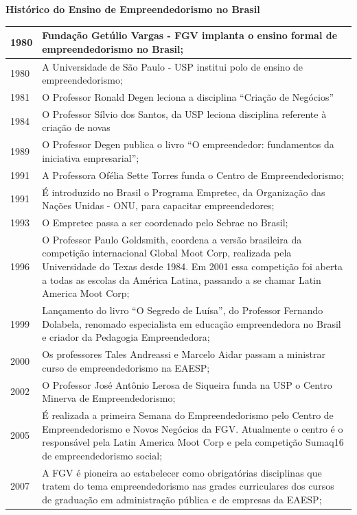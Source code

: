\begin{quadro}[!htb]
\caption{\label{tabela_1}\textbf{Histórico do Ensino de Empreendedorismo no Brasil}}
\begin{tabular}{p{1.5cm}p{13.0cm}}
\hline \hline
1980 & Fundação Getúlio Vargas - FGV implanta o ensino formal de empreendedorismo no Brasil;  \\\hline
1980 & A Universidade de São Paulo - USP institui polo de ensino de empreendedorismo;  \\\hline
1981 & O Professor Ronald Degen leciona a disciplina “Criação de Negócios”  \\ \hline
1984 & O Professor Sílvio dos Santos, da USP leciona disciplina referente à criação de novas \\ \hline
1989 & O Professor Degen publica o livro “O empreendedor: fundamentos da iniciativa empresarial”;  \\\hline
1991 & A Professora Ofélia Sette Torres funda o Centro de Empreendedorismo;  \\\hline
1991 & É introduzido no Brasil o Programa Empretec, da Organização das Nações Unidas - ONU, para
capacitar empreendedores;  \\\hline
1993 & O Empretec passa a ser coordenado pelo Sebrae no Brasil;  \\\hline
1996 & O Professor Paulo Goldsmith, coordena a versão brasileira da competição internacional Global Moot Corp, realizada pela Universidade do Texas desde 1984. Em 2001 essa competição foi aberta a todas as escolas da América Latina, passando a se chamar Latin America Moot Corp;\\\hline
1999 & Lançamento do livro “O Segredo de Luísa”, do Professor Fernando Dolabela, renomado
especialista em educação empreendedora no Brasil e criador da Pedagogia Empreendedora;  \\ \hline
2000 & Os professores Tales Andreassi e Marcelo Aidar passam a ministrar curso de empreendedorismo
na EAESP;  \\ \hline
 2002 & O Professor José Antônio Lerosa de Siqueira funda na USP o Centro Minerva de Empreendedorismo;  \\\hline 
   2005 & É realizada a primeira Semana do Empreendedorismo pelo Centro de Empreendedorismo e Novos Negócios da FGV. Atualmente o centro é o responsável pela Latin America Moot Corp e pela competição Sumaq16 de empreendedorismo social;  \\\hline 
   2007 & A FGV é pioneira ao estabelecer como obrigatórias disciplinas que tratem do tema empreendedorismo nas grades curriculares dos cursos de graduação em administração pública e de empresas da EAESP; \\\hline 
\end{tabular}
\end{quadro}

